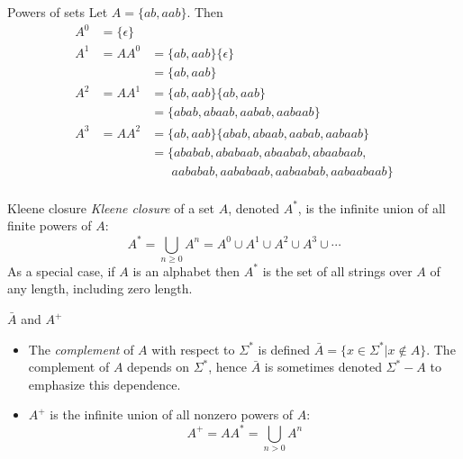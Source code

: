 \begin{slide}[bm=,toc=]{Powers of sets}
Let $A = \{ab,aab\}$. Then
\[
\begin{array}{lll}
A^0 &= \{\epsilon\} & \\[2ex]

A^1 &= AA^0         &= \{ab,aab\}\{\epsilon\} \\
    &               &= \{ab,aab\} \\[2ex]

A^2 &= AA^1         &= \{ab,aab\}\{ab,aab\}   \\
    &               &= \{abab,abaab,aabab,aabaab\} \\[2ex]

A^3 &= AA^2         &= \{ab,aab\}\{abab,abaab,aabab,aabaab\}  \\
    &               &= \{ababab,ababaab,abaabab,abaabaab,  \\
    &               &\;\;\;\;\;\;aababab,aababaab,aabaabab,aabaabaab \}  \\
\end{array}
\]
\end{slide}


\begin{slide}[bm=,toc=]{Kleene closure}
\emph{Kleene closure} of a set $A$, denoted $A^*$, is the infinite union of all
finite powers of $A$:
\[
A^* = \bigcup_{n \geq 0} A^n = A^0 \cup A^1 \cup A^2 \cup A^3 \cup \cdots
\]
As a special case, if $A$ is an alphabet then $A^*$ is the set of all strings
over $A$ of any length, including zero length.
\end{slide}

\begin{slide}[bm=,toc=]{$\bar{A}$ and $A^+$}
\begin{itemize}
   \item The \emph{complement} of $A$ with respect to $\Sigma^*$ is defined 
         $\bar{A} = \{x \in \Sigma^* | x \notin A\}$. The complement of $A$
         depends on $\Sigma^*$, hence $\bar{A}$ is sometimes denoted 
         $\Sigma^* - A$ to emphasize this dependence.
   \item $A^+$ is the infinite union of all nonzero powers of $A$:
         \[
           A^+ = AA^* = \bigcup_{n>0} A^n
           \]
\end{itemize}
\end{slide}




